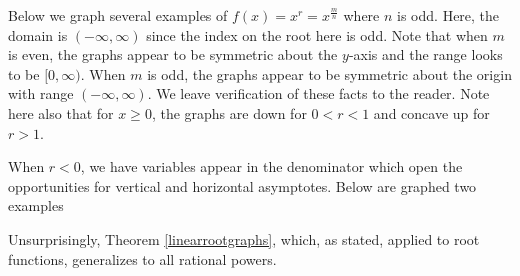 \documentclass{ximera}
\begin{document}
\begin{center}
\end{center}

Below we graph several examples of $f(x) =x^r =  x^{\frac{m}{n}}$ where $n$ is odd.   Here, the domain is $(-\infty, \infty)$ since the index on the root here is odd. Note that when $m$ is even, the graphs appear to be symmetric about the $y$-axis  and the range looks to be $[0, \infty)$.  When $m$ is odd, the graphs  appear to be symmetric about the origin with range $(-\infty, \infty)$.  We leave verification of these facts to the reader.   Note here also that for $x \geq 0$, the graphs are down for $0<r<1$ and concave up for $r > 1$. 

\begin{center}
\end{center}

When $r<0$, we have variables appear in the denominator which open the opportunities for vertical and horizontal asymptotes. Below are graphed two examples

\begin{center}
\end{center}


Unsurprisingly, Theorem \ref{linearrootgraphs}, which, as stated, applied to root functions, generalizes to all rational powers.  

 


\end{document}
